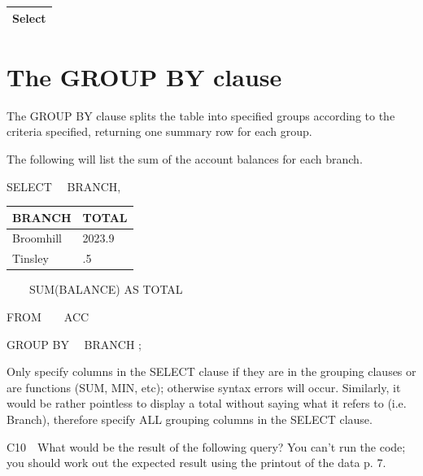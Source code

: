 \begin{flushleft}
\tablefirsthead{}
\tablehead{}
\tabletail{}
\tablelasttail{}
\begin{supertabular}{|m{14.583cm}|}
\hline
Select

\\\hline
\end{supertabular}
\end{flushleft}
\section{The GROUP BY clause}
The GROUP BY clause splits the table into specified groups according to the criteria specified, returning one summary row for each group.

The following will list the sum of the account balances for each branch.

 SELECT \ \ BRANCH,

\begin{center}
\begin{minipage}{4.692cm}
\begin{flushleft}
\tablefirsthead{}
\tablehead{}
\tabletail{}
\tablelasttail{}
\begin{supertabular}{|m{2.4919999cm}|m{1.798cm}|}
\hline
BRANCH &
TOTAL\\\hline
Broomhill &
2023.9\\\hline
Tinsley &
.5\\
\end{supertabular}
\end{flushleft}
\end{minipage}
\end{center}
\ \ \ \ SUM(BALANCE) AS TOTAL

FROM\ \  \ \ ACC 

GROUP BY \ \ BRANCH ;

Only specify columns in the SELECT clause if they are in the grouping clauses or are functions (SUM, MIN, etc); otherwise syntax errors will occur.  Similarly, it would be rather pointless to display a total without saying what it refers to (i.e. Branch), therefore specify ALL grouping columns in the SELECT clause.

C10\ \ What would be the result of the following query?  You can't run the code; you should work out the expected result using the printout of the data p. 7.



